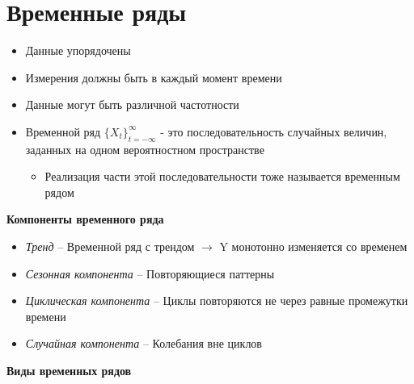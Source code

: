 \documentclass[a4paper, 12pt]{article}
\begin{document}
\section{Временные ряды}

\begin{itemize}
    \item Данные упорядочены
    \item Измерения должны быть в каждый момент времени
    \item Данные могут быть различной частотности
    \item Временной ряд $\{X_{t}\}_{t = -\infty}^{\infty}$ - это последовательность случайных величин, заданных на одном вероятностном пространстве
    \begin{itemize}
        \item Реализация части этой последовательности тоже называется временным рядом
    \end{itemize}
\end{itemize}

\textbf{Компоненты временного ряда}

\begin{itemize}
    \item \textit{Тренд} -- Временной ряд с трендом $\rightarrow$ Y монотонно изменяется со временем
    \item \textit{Сезонная компонента} -- Повторяющиеся паттерны
    \item \textit{Циклическая компонента} -- Циклы повторяются не через равные промежутки времени
    \item \textit{Случайная компонента} -- Колебания вне циклов
\end{itemize}

\textbf{Виды временных рядов}
\end{document}
